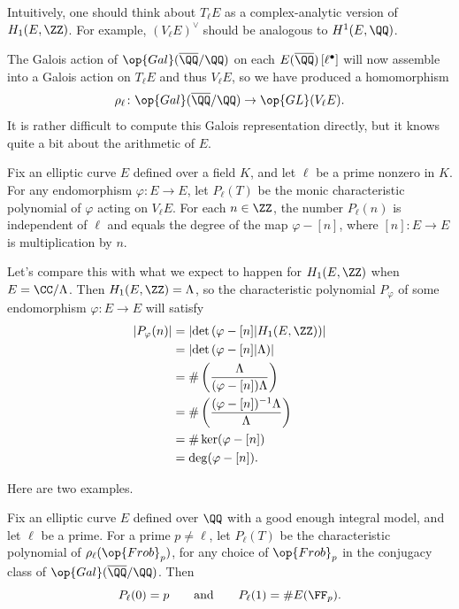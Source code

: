 \documentclass{article}
\begin{document}
\begin{remark}
	Intuitively, one should think about $T_\ell E$ as a complex-analytic version of $H_1(E,\ZZ)$. For example, $(V_\ell E)^\lor$ should be analogous to $H^1(E,\QQ)$.
\end{remark}
The Galois action of $\op{Gal}(\overline\QQ/\QQ)$ on each $E(\overline\QQ)\left[\ell^\bullet\right]$ will now assemble into a Galois action on $T_\ell E$ and thus $V_\ell E$, so we have produced a homomorphism
\[\rho_\ell\colon\op{Gal}(\overline\QQ/\QQ)\to\op{GL}(V_\ell E).\]
It is rather difficult to compute this Galois representation directly, but it knows quite a bit about the arithmetic of $E$.
\begin{proposition} \label{prop:char-polys-on-h1}
	Fix an elliptic curve $E$ defined over a field $K$, and let $\ell$ be a prime nonzero in $K$. For any endomorphism $\varphi\colon E\to E$, let $P_\ell(T)$ be the monic characteristic polynomial of $\varphi$ acting on $V_\ell E$. For each $n\in\ZZ$, the number $P_\ell(n)$ is independent of $\ell$ and equals the degree of the map $\varphi-[n]$, where $[n]\colon E\to E$ is multiplication by $n$.
\end{proposition}
\begin{example}
	Let's compare this with what we expect to happen for $H_1(E,\ZZ)$ when $E=\CC/\Lambda$. Then $H_1(E,\ZZ)=\Lambda$, so the characteristic polynomial $P_\varphi$ of some endomorphism $\varphi\colon E\to E$ will satisfy
	\begin{align*}
		\left|P_\varphi(n)\right| &= \left|\det\left(\varphi-[n]\vert H_1(E,\ZZ)\right)\right| \\
		&= \left|\det\left(\varphi-[n]\vert \Lambda\right)\right| \\
		&= \#\left(\frac{\Lambda}{(\varphi-[n])\Lambda}\right) \\
		&= \#\left(\frac{(\varphi-[n])^{-1}\Lambda}\Lambda\right) \\
		&= \#\ker(\varphi-[n]) \\
		&= \deg(\varphi-[n]).
	\end{align*}
\end{example}
Here are two examples.
\begin{corollary} \label{cor:char-poly-frob}
	Fix an elliptic curve $E$ defined over $\QQ$ with a good enough integral model, and let $\ell$ be a prime. For a prime $p\ne\ell$, let $P_\ell(T)$ be the characteristic polynomial of $\rho_\ell({\op{Frob}_p})$, for any choice of $\op{Frob}_p$ in the conjugacy class of $\op{Gal}(\overline\QQ/\QQ)$. Then
	\[P_\ell(0)=p\qquad\text{and}\qquad P_\ell(1)=\#E(\FF_p).\]
\end{corollary}
\end{document}
